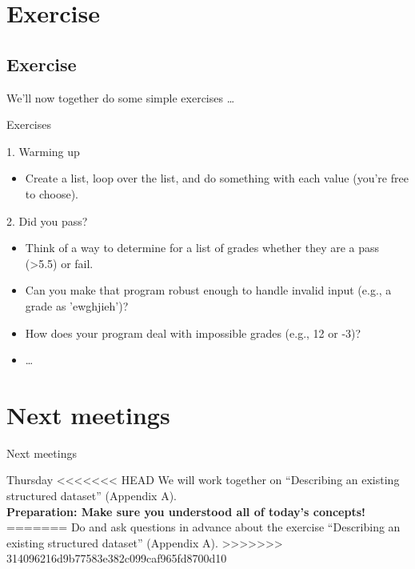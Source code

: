 \documentclass{beamer}
\begin{document}
\section{Exercise}
\subsection*{Exercise}
\begin{frame}
We'll now together do some simple exercises \ldots
\end{frame}



\begin{frame}{Exercises}
\begin{block}{1. Warming up}
\begin{itemize}
	\item Create a list, loop over the list, and do something with each value (you're free to choose). 
\end{itemize}
\end{block}
\begin{block}{2. Did you pass?}
	\begin{itemize}
	\item Think of a way to determine for a list of  grades whether they are a pass (>5.5) or fail.
	\item Can you make that program robust enough to handle invalid input (e.g., a grade as 'ewghjieh')?
	\item How does your program deal with impossible grades (e.g., 12 or -3)?
	\item \ldots
\end{itemize}
\end{block}
\end{frame}

\section{Next meetings}
\begin{frame}
Next meetings
\end{frame}


\begin{frame}{Thursday}
<<<<<<< HEAD
	We will work together on ``Describing an existing structured dataset'' (Appendix A).\\
	\textbf{Preparation: Make sure you understood all of today's concepts!}
=======
	Do and ask questions in advance about the exercise ``Describing an existing structured dataset'' (Appendix A).
>>>>>>> 314096216d9b77583e382c099caf965fd8700d10
\end{frame}
\end{document}

